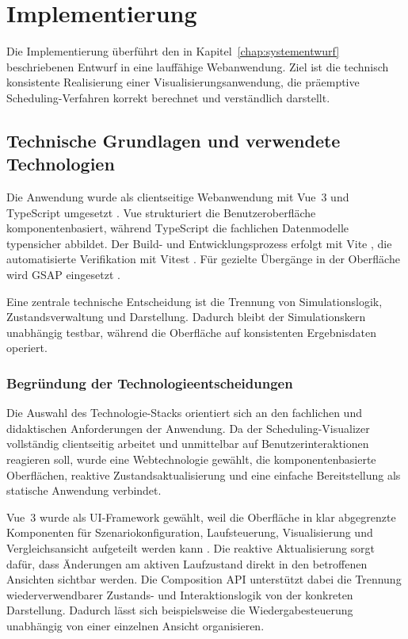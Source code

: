 \chapter{Implementierung}

Die Implementierung überführt den in Kapitel~\ref{chap:systementwurf} beschriebenen Entwurf in eine lauffähige Webanwendung. Ziel ist die technisch konsistente Realisierung einer Visualisierungsanwendung, die präemptive Scheduling-Verfahren korrekt berechnet und verständlich darstellt.

\section{Technische Grundlagen und verwendete Technologien}

Die Anwendung wurde als clientseitige Webanwendung mit Vue~3 und TypeScript umgesetzt \cite{vue3docs}. Vue strukturiert die Benutzeroberfläche komponentenbasiert, während TypeScript die fachlichen Datenmodelle typensicher abbildet. Der Build- und Entwicklungsprozess erfolgt mit Vite \cite{vitedocs}, die automatisierte Verifikation mit Vitest \cite{vitestdocs}. Für gezielte Übergänge in der Oberfläche wird GSAP eingesetzt \cite{gsapdocs}.

Eine zentrale technische Entscheidung ist die Trennung von Simulationslogik, Zustandsverwaltung und Darstellung. Dadurch bleibt der Simulationskern unabhängig testbar, während die Oberfläche auf konsistenten Ergebnisdaten operiert.

\subsection{Begründung der Technologieentscheidungen}

Die Auswahl des Technologie-Stacks orientiert sich an den fachlichen und didaktischen Anforderungen der Anwendung. Da der Scheduling-Visualizer vollständig clientseitig arbeitet und unmittelbar auf Benutzerinteraktionen reagieren soll, wurde eine Webtechnologie gewählt, die komponentenbasierte Oberflächen, reaktive Zustandsaktualisierung und eine einfache Bereitstellung als statische Anwendung verbindet.

Vue~3 wurde als UI-Framework gewählt, weil die Oberfläche in klar abgegrenzte Komponenten für Szenariokonfiguration, Laufsteuerung, Visualisierung und Vergleichsansicht aufgeteilt werden kann \cite{vue3docs}. Die reaktive Aktualisierung sorgt dafür, dass Änderungen am aktiven Laufzustand direkt in den betroffenen Ansichten sichtbar werden. Die Composition API unterstützt dabei die Trennung wiederverwendbarer Zustands- und Interaktionslogik von der konkreten Darstellung. Dadurch lässt sich beispielsweise die Wiedergabesteuerung unabhängig von einer einzelnen Ansicht organisieren.

